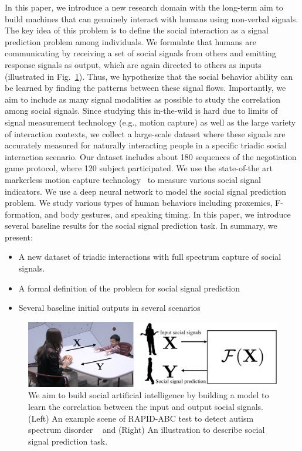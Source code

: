 In this paper, we introduce a new research domain with the long-term aim to build machines that can genuinely interact with humans using non-verbal signals. The key idea of this problem is to define the social interaction as a signal prediction problem among individuals. We formulate that humans are communicating by receiving a set of social signals from others and emitting response signals as output, which are again directed to others as inputs (illustrated in Fig.~\ref{fig:intro}). Thus, we hypothesize that the social behavior ability can be learned by finding the patterns between these signal flows. Importantly, we aim to include as many signal modalities as possible to study the correlation among social signals. Since studying this in-the-wild is hard due to limits of signal measurement technology (e.g., motion capture) as well as the large variety of interaction contexts, we collect a large-scale dataset where these signals are accurately measured for naturally interacting people in a specific triadic social interaction scenario. Our dataset includes about 180 sequences of the negotiation game protocol, where 120 subject participated. We use the state-of-the art markerless motion capture technology~\cite{joo2018} to measure various social signal indicators. We use a deep neural network to model the social signal prediction problem. We study various types of human behaviors including proxemics, F-formation, and body gestures, and speaking timing. In this paper, we introduce several baseline results for the social signal prediction task. In summary, we present:
\begin{itemize}
    \item A new dataset of triadic interactions with full spectrum capture of social signals. 
    \item A formal definition of the problem for social signal prediction
    \item Several baseline initial outputs in several scenarios
\end{itemize}

\begin{figure}
	\centering
	\includegraphics[width=\linewidth]{ssp_fig/intro}
	\caption{We aim to build social artificial intelligence by building a model to learn the correlation between the input and output social signals. (Left) An example scene of RAPID-ABC test to detect autism spectrum disorder ~\cite{mathys2013beyond} and (Right) An illustration to describe social signal prediction task.}
	\label{fig:intro}
\end{figure}

